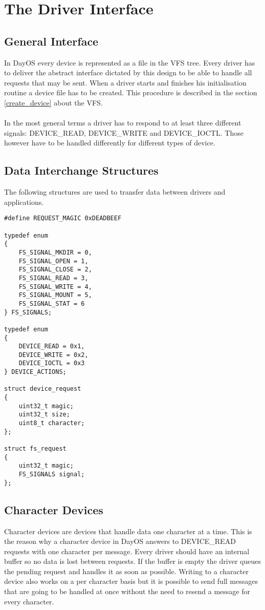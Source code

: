 \section{The Driver Interface}
\subsection{General Interface}
In DayOS every device is represented as a file in the VFS tree. Every driver has to deliver
the abstract interface dictated by this design to be able to handle all requests that may
be sent. When a driver starts and finishes his initialisation routine a device file has to be
created. This procedure is described in the section \ref{create_device} about the VFS. \\ \\
In the most general terms a driver has to respond to at least three different signals:
DEVICE\_READ, DEVICE\_WRITE and DEVICE\_IOCTL. Those however have to be handled differently for different types of device.

\subsection{Data Interchange Structures}
The following structures are used to transfer data between drivers and applications.
\begin{verbatim}
#define REQUEST_MAGIC 0xDEADBEEF

typedef enum
{
	FS_SIGNAL_MKDIR = 0,
	FS_SIGNAL_OPEN = 1,
	FS_SIGNAL_CLOSE = 2,
	FS_SIGNAL_READ = 3,
	FS_SIGNAL_WRITE = 4,
	FS_SIGNAL_MOUNT = 5,
	FS_SIGNAL_STAT = 6
} FS_SIGNALS;

typedef enum
{
	DEVICE_READ = 0x1,
	DEVICE_WRITE = 0x2,
    DEVICE_IOCTL = 0x3
} DEVICE_ACTIONS;

struct device_request
{
    uint32_t magic;
    uint32_t size;
    uint8_t character;
};

struct fs_request
{
    uint32_t magic;
    FS_SIGNALS signal;    
};

\end{verbatim}

\subsection{Character Devices}
Character devices are devices that handle data one character at a time. This is the reason why
a character device in DayOS answers to DEVICE\_READ requests with one character per message.
Every driver should have an internal buffer so no data is lost between requests. If the
buffer is empty the driver queues the pending request and handles it as soon as possible.
Writing to a character device also works on a per character basis but it is possible to
send full messages that are going to be handled at once without the need to resend a message
for every character.

